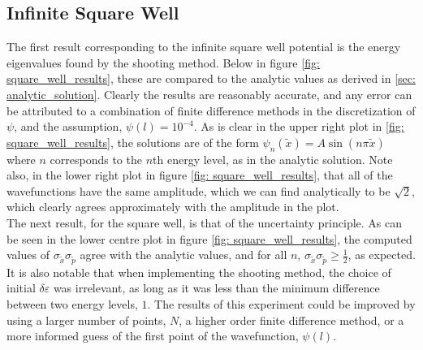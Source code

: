 \documentclass[10pt,a4paper]{article}
\theoremstyle{definition}
\theoremstyle{remark}
\begin{document}
\subsection{Infinite Square Well}
\label{sec: square_well_results}
The first result corresponding to the infinite square well potential is the energy eigenvalues found by the shooting method. Below in figure \ref{fig: square_well_results}, these are compared to the analytic values as derived in \ref{sec: analytic_solution}. Clearly the results are reasonably accurate, and any error can be attributed to a combination of finite difference methods in the discretization of $\psi$, and the assumption, $\psi(l)=10^{-4}$. As is clear in the upper right plot in \ref{fig: square_well_results}, the solutions are of the form $\psi_n(\tilde{x})=A\sin(n\pi \tilde{x})$ where $n$ corresponds to the $n$th energy level, as in the analytic solution. Note also, in the lower right plot in figure \ref{fig: square_well_results}, that all of the wavefunctions have the same amplitude, which we can find analytically to be $\sqrt{2}$, which clearly agrees approximately with the amplitude in the plot.\\
\indent The next result, for the square well, is that of the uncertainty principle. As can be seen in the lower centre plot in figure \ref{fig: square_well_results}, the computed values of $\sigma_{\tilde{x}}\sigma_{\tilde{p}}$ agree with the analytic values, and for all $n$, $\sigma_{\tilde{x}}\sigma_{\tilde{p}}\geq \frac{1}{2}$, as expected.\\
\indent It is also notable that when implementing the shooting method, the choice of initial $\delta\varepsilon$ was irrelevant, as long as it was less than the minimum difference between two energy levels, $1$. The results of this experiment could be improved by using a larger number of points, $N$, a higher order finite difference method, or a more informed guess of the first point of the wavefunction, $\psi(l)$.\\ 
\end{document}
